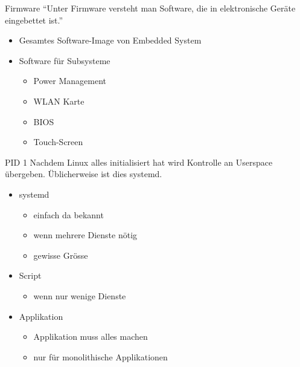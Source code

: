



\begin{frame}{Firmware}
	``Unter Firmware versteht man Software, die in elektronische Geräte eingebettet ist.'' \cite{wikiFirmware}
	
	\begin{itemize}
		\item Gesamtes Software-Image von Embedded System
		\item Software für Subsysteme
		\begin{itemize}
			\item Power Management
			\item WLAN Karte
			\item BIOS
			\item Touch-Screen
		\end{itemize}
	\end{itemize}
\end{frame}

\begin{frame}{PID 1}
	Nachdem Linux alles initialisiert hat wird Kontrolle an Userspace übergeben.
	Üblicherweise ist dies systemd.
	\begin{itemize}
		\item systemd
		\begin{itemize}
			\item einfach da bekannt
			\item wenn mehrere Dienste nötig
			\item gewisse Grösse
		\end{itemize}
		\item Script
		\begin{itemize}
			\item wenn nur wenige Dienste
		\end{itemize}
		\item Applikation
		\begin{itemize}
			\item Applikation muss alles machen
			\item nur für monolithische Applikationen
		\end{itemize}
	\end{itemize}
\end{frame}

